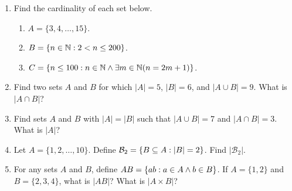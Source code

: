 \documentclass{book}
\begin{document}
\setcounter{project}{330}
\addtocounter{project}{-1}
\begin{investigation}[]\label{investigation-10}
\hypertarget{p-2041}{}%
\leavevmode%
\begin{enumerate}
\item\hypertarget{li-265}{}\hypertarget{p-2042}{}%
Find the cardinality of each set below. %
\begin{enumerate}
\item\hypertarget{li-266}{}\(A = \{3,4,\ldots, 15\}\).%
\item\hypertarget{li-267}{}\(B = \{n \in \mathbb N : 2 <  n \le 200\}\).%
\item\hypertarget{li-268}{}\(C = \{n \le 100 : n \in \mathbb N \wedge \exists m \in \mathbb N (n = 2m+1)\}\).%
\end{enumerate}
%
\item\hypertarget{li-269}{}\hypertarget{p-2043}{}%
Find two sets \(A\) and \(B\) for which \(|A| = 5\), \(|B| = 6\), and \(|A\cup B| = 9\). What is \(|A \cap B|\)?%
\item\hypertarget{li-270}{}\hypertarget{p-2044}{}%
Find sets \(A\) and \(B\) with \(|A| = |B|\) such that \(|A\cup B| = 7\) and \(|A \cap B| = 3\). What is \(|A|\)?%
\item\hypertarget{li-271}{}\hypertarget{p-2045}{}%
Let \(A = \{1,2,\ldots, 10\}\). Define \(\mathcal{B}_2 = \{B \subseteq A : |B| = 2\}\). Find \(|\mathcal{B}_2|\).%
\item\hypertarget{li-272}{}For any sets \(A\) and \(B\), define \(AB = \{ab : a\in A \wedge b \in B\}\). If \(A = \{1,2\}\) and \(B = \{2,3,4\}\), what is \(|AB|\)? What is \(|A \times B|\)?%
\end{enumerate}
%
\end{investigation}
\end{document}
